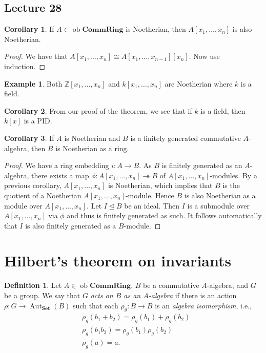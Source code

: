 \documentclass[10pt,letterpaper,cm]{nupset}
\theoremstyle{definition}
\newtheorem*{definition}{Definition}
\newtheorem{exmp}{Example}
\newtheorem{corollary}{Corollary}
\newcommand{\Z}{\mathbb Z}
\newcommand{\1}{\mathbf{1}}
\newcommand{\0}{\vec 0}
\DeclareMathOperator{\aut}{Aut}
\DeclareMathOperator{\ob}{ob}
\begin{document}
\subsection{Lecture 28}

\begin{corollary}
If $A \in \ob \mathbf{CommRing}$ is Noetherian, then $A[x_1, \ldots, x_n]$ is also Noetherian.
\end{corollary}
\begin{proof}
We have that $A[x_1, \ldots, x_n] \cong A[x_1, \ldots, x_{n-1}][x_n]$. Now use induction.
\end{proof}

\begin{exmp}
Both $\Z[x_1, \ldots, x_n]$ and $k[x_1, \ldots, x_n]$ are Noetherian where $k$ is a field.
\end{exmp}

\begin{corollary}
From our proof of the theorem, we see that if $k$ is a field, then $k[x]$ is a PID.
\end{corollary}

\begin{corollary}
If $A$ is Noetherian and $B$ is a finitely generated commutative $A$-algebra, then $B$ is Noetherian as a ring.
\end{corollary}
\begin{proof}
We have a ring embedding $i: A \to B$. As $B$ is finitely generated as an $A$-algebra, there exists a map $\phi: A[x_1, \ldots, x_n] \twoheadrightarrow B$ of $A[x_1, \ldots, x_n]$-modules. By a previous corollary, $A[x_1, \ldots, x_n]$ is Noetherian, which implies that $B$ is the quotient of a Noetherian $A[x_1, \ldots, x_n]$-module. Hence $B$ is also Noetherian as a module over $A[x_1, \ldots, x_n]$. Let $I\unlhd B$ be an ideal. Then $I$ is a submodule over $A[x_1, \ldots, x_n]$ via $\phi$ and thus is finitely generated as such. It follows automatically that $I$ is also finitely generated as a $B$-module.
\end{proof}

\section{Hilbert's theorem on invariants}

\begin{definition}
Let $A \in \ob \mathbf{CommRing}$, $B$ be a commutative $A$-algebra, and $G$ be a group. We say that $G$ \textit{acts on $B$ as an $A$-algebra} if there is an action $\rho : G \to \aut_{\mathbf{Set}}(B)$ such that each  $\rho_g  : B \to B$ is an \textit{algebra isomorphism}, i.e., 
\begin{align*}
&  \rho_g(b_1 +b_2) = \rho_g(b_1) + \rho_g(b_2)
\\ & \rho_g(b_1b_2) = \rho_g(b_1)\rho_g(b_2)
\\ & \rho_g(a) = a
.\end{align*}
\end{definition}
\end{document}
